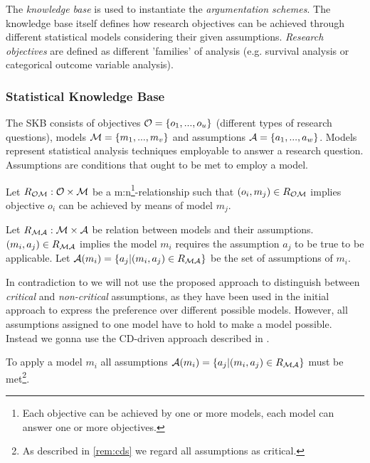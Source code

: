 The \textit{knowledge base} is used to instantiate the \textit{argumentation schemes}. The knowledge base itself defines how research objectives can be achieved through different statistical models considering their given assumptions. \textit{Research objectives} are defined as different 'families' of analysis (e.g. survival analysis or categorical outcome variable analysis).


\subsubsection*{Statistical Knowledge Base}
\label{sub:SKB}

The \gls{SKB} consists of objectives $\mathcal{O}=\{o_1, ..., o_u\}$ (different types of research questions), models $\mathcal{M}=\{m_1, ..., m_v\}$ and assumptions $\mathcal{A} = \{a_1, ..., a_w\}$. Models represent statistical analysis techniques employable to answer a research question. Assumptions are conditions that ought to be met to employ a model.

\begin{definition}
	Let $R_{\mathcal{O}\mathcal{M}}: \mathcal{O} \times \mathcal{M}$ be a m:n\footnote{Each objective can be achieved by one or more models, each model can answer one or more objectives.}-relationship such that $(o_i, m_j)\in R_{\mathcal{O}\mathcal{M}}$ implies objective $o_i$ can be achieved by means of model $m_j$. 
\end{definition}

\begin{definition}
	Let $R_{\mathcal{M}\mathcal{A}}: \mathcal{M} \times \mathcal{A}$ be relation between models and their assumptions. $(m_i, a_j)\in R_{\mathcal{M}\mathcal{A}}$ implies  the model $m_i$ requires the assumption $a_j$ to be true to be applicable. Let $\mathcal{A}(m_i) = \{a_j | (m_i, a_j) \in R_{\mathcal{M}\mathcal{A}}\}$ be the set of assumptions of $m_i$.
\end{definition}

\begin{remark}
In contradiction to \cite{sassoon2014} we will not use the proposed approach to distinguish between \textit{critical} and \textit{non-critical} assumptions, as they have been used in the initial approach to express the preference over different possible models. However, all assumptions assigned to one model have to hold to make a model possible. Instead we gonna use the \gls{CD}-driven approach described in \cite{sassoon2016CD}.
\label{rem:cds}
\end{remark}


\begin{definition}
To apply a model $m_i$ all assumptions $\mathcal{A}(m_i) = \{a_j | (m_i, a_j) \in R_{\mathcal{M}\mathcal{A}} \}$ must be met\footnote{As described in \autoref{rem:cds} we regard all assumptions as critical.}.
\end{definition}

